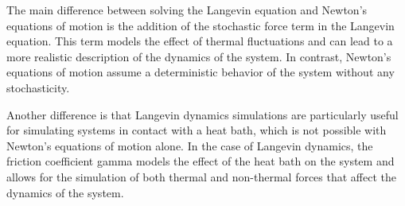\documentclass{ucetd}
\begin{document}
The main difference between solving the Langevin equation and Newton's equations of motion is the addition of the stochastic force term in the Langevin equation. This term models the effect of thermal fluctuations and can lead to a more realistic description of the dynamics of the system. In contrast, Newton's equations of motion assume a deterministic behavior of the system without any stochasticity.

Another difference is that Langevin dynamics simulations are particularly useful for simulating systems in contact with a heat bath, which is not possible with Newton's equations of motion alone. In the case of Langevin dynamics, the friction coefficient gamma models the effect of the heat bath on the system and allows for the simulation of both thermal and non-thermal forces that affect the dynamics of the system.
\end{document}
